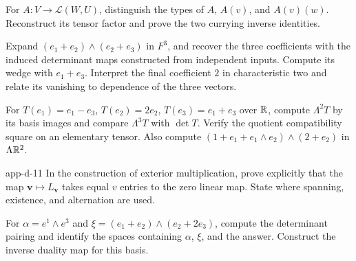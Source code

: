 \begin{exercise}
For $A:V\to\mathcal L(W,U)$, distinguish the types of $A$, $A(v)$, and
$A(v)(w)$. Reconstruct its tensor factor and prove the two currying inverse identities.
\end{exercise}
\begin{exercise}
Expand $(e_1+e_2)\wedge(e_2+e_3)$ in $F^3$, and recover the three
coefficients with the induced determinant maps constructed from independent inputs.
Compute its wedge with $e_1+e_3$. Interpret the final coefficient $2$
 in characteristic two and relate its vanishing to dependence of the three vectors.
\end{exercise}
\begin{exercise}
For $T(e_1)=e_1-e_3$, $T(e_2)=2e_2$, $T(e_3)=e_1+e_3$ over $\mathbb{R}$,
compute $\Lambda^2T$ by its basis images and compare $\Lambda^3T$ with
$\det T$. Verify the quotient compatibility square on an elementary tensor.
Also compute $(1+e_1+e_1\wedge e_2)\wedge(2+e_2)$ in $\Lambda\mathbb{R}^2$.
\end{exercise}
\begin{hexercise}{app-d-11}
In the construction of exterior multiplication, prove explicitly that the
map $\mathbf v\mapsto L_{\mathbf v}$ takes equal $v$ entries to the zero
linear map. State where spanning, existence, and alternation are used.
\end{hexercise}
\begin{exercise}
For $\alpha=e^1\wedge e^3$ and $\xi=(e_1+e_2)\wedge(e_2+2e_3)$,
compute the determinant pairing and identify the spaces containing $\alpha$,
$\xi$, and the answer. Construct the inverse duality map for this basis.
\end{exercise}
